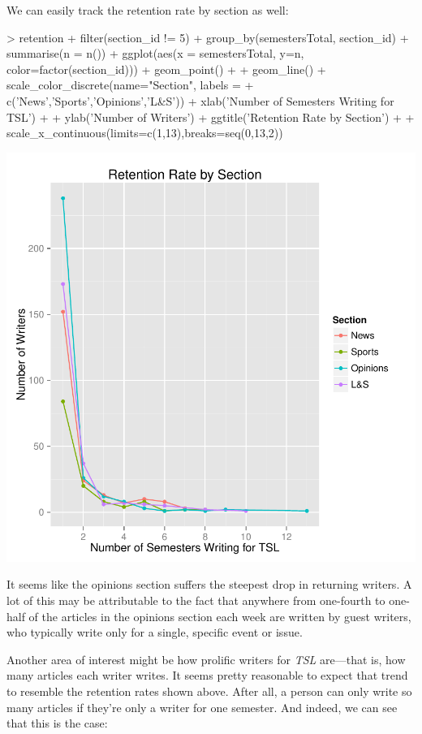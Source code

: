 \documentclass[a4paper]{article}
\begin{document}
We can easily track the retention rate by section as well:

\begin{Schunk}
\begin{Sinput}
> retention %
+   filter(section_id != 5) %
+   group_by(semestersTotal, section_id) %
+   summarise(n = n()) %
+   ggplot(aes(x = semestersTotal, y=n, color=factor(section_id))) + geom_point() +
+   geom_line() + scale_color_discrete(name="Section", labels =
+   c('News','Sports','Opinions','L&S')) + xlab('Number of Semesters Writing for TSL') +
+   ylab('Number of Writers') + ggtitle('Retention Rate by Section') +
+   scale_x_continuous(limits=c(1,13),breaks=seq(0,13,2))
\end{Sinput}
\end{Schunk}
\includegraphics{FinalProject-016}

It seems like the opinions section suffers the steepest drop in returning writers. A lot of this may be attributable to the fact that anywhere from one-fourth to one-half of the articles in the opinions section each week are written by guest writers, who typically write only for a single, specific event or issue. 

Another area of interest might be how prolific writers for \textit{TSL} are---that is, how many articles each writer writes. It seems pretty reasonable to expect that trend to resemble the retention rates shown above. After all, a person can only write so many articles if they're only a writer for one semester. And indeed, we can see that this is the case:
\end{document}
